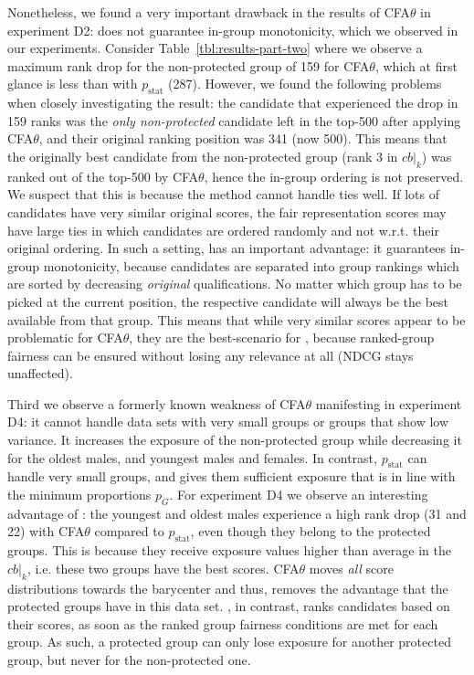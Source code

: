 %
Nonetheless, we found a very important drawback in the results of CFA$\theta$ in experiment D2: \citet{zehlike2020matching} does not guarantee in-group monotonicity, which we observed in our experiments.
%
Consider Table~\ref{tbl:results-part-two} where we observe a maximum rank drop for the non-protected group of 159 for CFA$\theta$, which at first glance is less than \algoFAIR with $p_{\text{stat}}$ (287).
%
However, we found the following problems when closely investigating the result: the candidate that experienced the drop in 159 ranks was the \emph{only non-protected} candidate left in the top-500 after applying CFA$\theta$, and their original ranking position was 341 (now 500).
%
This means that the originally best candidate from the non-protected group (rank 3 in $cb|_k$) was ranked out of the top-500 by CFA$\theta$, hence the in-group ordering is not preserved.
%
We suspect that this is because the method cannot handle ties well.  %
%
If lots of candidates have very similar original scores, the fair representation scores may have large ties in which candidates are ordered randomly and not w.r.t. their original ordering.
%
In such a setting, \algoFAIR has an important advantage: it guarantees in-group monotonicity, because candidates are separated into group rankings which are sorted by decreasing \emph{original} qualifications.
%
No matter which group has to be picked at the current position, the respective candidate will always be the best available from that group.
%
This means that while very similar scores appear to be problematic for CFA$\theta$, they are the best-scenario for \algoFAIR, because ranked-group fairness can be ensured without losing any relevance at all (NDCG stays unaffected).
%

Third we observe a formerly known weakness of CFA$\theta$ manifesting in experiment D4: it cannot handle data sets with very small groups or groups that show low variance.
%
It increases the exposure of the non-protected group while decreasing it for the oldest males, and youngest males and females.
%
In contrast, \algoFAIR $p_{\text{stat}}$ can handle very small groups, and gives them sufficient exposure that is in line with the minimum proportions $p_G$.
%
For experiment D4 we observe an interesting advantage of \algoFAIR: the youngest and oldest males experience a high rank drop (31 and 22) with CFA$\theta$ compared to \algoFAIR $p_{\text{stat}}$, even though they belong to the protected groups.
%
This is because they receive exposure values higher than average in the $cb|_k$, i.e. these two groups have the best scores.
%
CFA$\theta$ moves \emph{all} score distributions towards the barycenter and thus, removes the advantage that the protected groups have in this data set.
%
\algoFAIR, in contrast, ranks candidates based on their scores, as soon as the ranked group fairness conditions are met for each group.
%
As such, a protected group can only lose exposure for another protected group, but never for the non-protected one.

